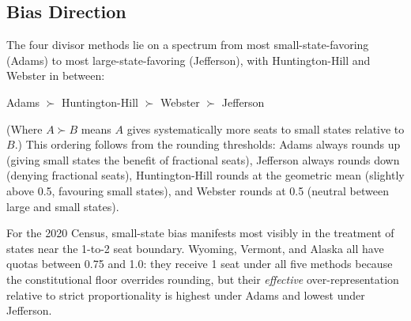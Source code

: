 \subsection{Bias Direction}

The four divisor methods lie on a spectrum from most small-state-favoring
(Adams) to most large-state-favoring (Jefferson), with
Huntington-Hill and Webster in between:

\begin{center}
Adams $\succ$ Huntington-Hill $\succ$ Webster $\succ$ Jefferson
\end{center}

\noindent
(Where $A \succ B$ means $A$ gives systematically more seats to small
states relative to $B$.)
This ordering follows from the rounding thresholds:
Adams always rounds up (giving small states the benefit of fractional
seats), Jefferson always rounds down (denying fractional seats),
Huntington-Hill rounds at the geometric mean (slightly above 0.5,
favouring small states), and Webster rounds at 0.5 (neutral between
large and small states).

For the 2020 Census, small-state bias manifests most visibly in the
treatment of states near the 1-to-2 seat boundary.
Wyoming, Vermont, and Alaska all have quotas between 0.75 and 1.0:
they receive 1 seat under all five methods because the constitutional
floor overrides rounding, but their \emph{effective} over-representation
relative to strict proportionality is highest under Adams and lowest
under Jefferson.
